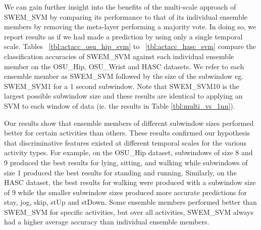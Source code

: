 \documentclass[letterpaper]{article}
\begin{document}

We can gain further insight into the benefits of the multi-scale approach of SWEM\_SVM by comparing its performance to that of its individual ensemble members by removing the meta-layer performing a majority vote. In doing so, we report results as if we had made a prediction by using only a single temporal scale. Tables ~\ref{tbl:actacc_osu_hip_svm} to ~\ref{tbl:actacc_hasc_svm} compare the classification accuracies of SWEM\_SVM against each individual ensemble member on the OSU\_Hip, OSU\_Wrist and HASC datasets. We refer to each ensemble member as SWEM\_SVM followed by the size of the subwindow eg. SWEM\_SVM1 for a 1 second subwindow. Note that SWEM\_SVM10 is the largest possible subwindow size and these results are identical to applying an SVM to each window of data (ie. the results in Table \ref{tbl:multi_vs_1nn}).

Our results show that ensemble members of different subwindow sizes performed better for certain activities than others. These results confirmed our hypothesis that discriminative features existed at different temporal scales for the various activity types. For example, on the OSU\_Hip dataset, subwindows of size 8 and 9 produced the best results for lying, sitting, and walking while subwindows of size 1 produced the best results for standing and running. Similarly, on the HASC dataset, the best results for walking were produced with a subwindow size of 9 while the smaller subwindow sizes produced more accurate predictions for stay, jog, skip, stUp and stDown. Some ensemble members performed better than SWEM\_SVM for specific activities, but over all activities, SWEM\_SVM always had a higher average accuracy than individual ensemble members.
\end{document}
